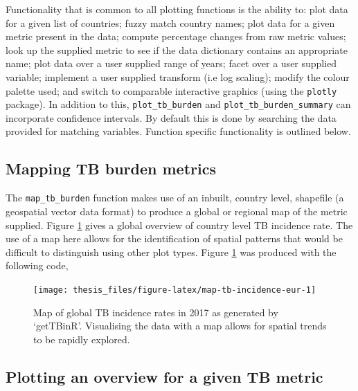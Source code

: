 \documentclass[11pt,twoside]{bristolthesis}
\begin{document}
  Functionality that is common to all plotting functions is the ability to: plot data for a given list of countries; fuzzy match country names; plot data for a given metric present in the data; compute percentage changes from raw metric values; look up the supplied metric to see if the data dictionary contains an appropriate name; plot data over a user supplied range of years; facet over a user supplied variable; implement a user supplied transform (i.e log scaling); modify the colour palette used; and switch to comparable interactive graphics (using the \texttt{plotly} package). In addition to this, \texttt{plot\_tb\_burden} and \texttt{plot\_tb\_burden\_summary} can incorporate confidence intervals. By default this is done by searching the data provided for matching variables. Function specific functionality is outlined below.
  
  \hypertarget{mapping-tb-burden-metrics}{%
  \subsection{Mapping TB burden metrics}\label{mapping-tb-burden-metrics}}
  
  The \texttt{map\_tb\_burden} function makes use of an inbuilt, country level, shapefile (a geospatial vector data format) to produce a global or regional map of the metric supplied. Figure \ref{fig:map-tb-incidence-eur} gives a global overview of country level TB incidence rate. The use of a map here allows for the identification of spatial patterns that would be difficult to distinguish using other plot types. Figure \ref{fig:map-tb-incidence-eur} was produced with the following code,
  \begin{Shaded}
  \begin{Highlighting}[]
  \NormalTok{(} \NormalTok{, } \NormalTok{)}
  \end{Highlighting}
  \end{Shaded}
  \begin{figure}
  
  {\centering \texttt{[image: thesis\_files/figure-latex/map-tb-incidence-eur-1]} 
  
  }
  
  \caption{Map of global TB incidence rates in 2017 as generated by `getTBinR'. Visualising the data with a map allows for spatial trends to be rapidly explored.}\label{fig:map-tb-incidence-eur}
  \end{figure}
  \hypertarget{plotting-an-overview-for-a-given-tb-metric}{%
  \subsection{Plotting an overview for a given TB metric}\label{plotting-an-overview-for-a-given-tb-metric}}
  
\end{document}
